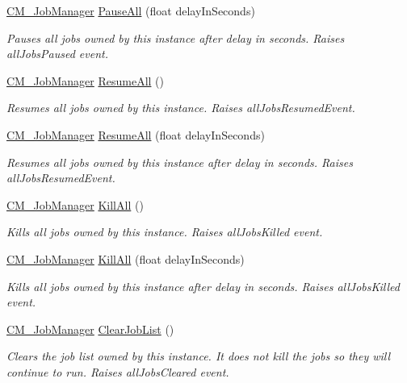 \begin{DoxyCompactItemize}
\hyperlink{class_c_m___job_manager}{C\+M\+\_\+\+Job\+Manager} \hyperlink{class_c_m___job_manager_a32a5f874cae07a572b5f5115c48fc528}{Pause\+All} (float delay\+In\+Seconds)
\begin{DoxyCompactList}\small\item\em Pauses all jobs owned by this instance after delay in seconds. Raises all\+Jobs\+Paused event. \end{DoxyCompactList}\item 
\hyperlink{class_c_m___job_manager}{C\+M\+\_\+\+Job\+Manager} \hyperlink{class_c_m___job_manager_a838152b138f04a0c4c254f3b56bd31fe}{Resume\+All} ()
\begin{DoxyCompactList}\small\item\em Resumes all jobs owned by this instance. Raises all\+Jobs\+Resumed\+Event. \end{DoxyCompactList}\item 
\hyperlink{class_c_m___job_manager}{C\+M\+\_\+\+Job\+Manager} \hyperlink{class_c_m___job_manager_ac87588d5764ca7a71208ff96f3fd67f7}{Resume\+All} (float delay\+In\+Seconds)
\begin{DoxyCompactList}\small\item\em Resumes all jobs owned by this instance after delay in seconds. Raises all\+Jobs\+Resumed\+Event. \end{DoxyCompactList}\item 
\hyperlink{class_c_m___job_manager}{C\+M\+\_\+\+Job\+Manager} \hyperlink{class_c_m___job_manager_ab5a27b84b4fd3893e1dc271570930e62}{Kill\+All} ()
\begin{DoxyCompactList}\small\item\em Kills all jobs owned by this instance. Raises all\+Jobs\+Killed event. \end{DoxyCompactList}\item 
\hyperlink{class_c_m___job_manager}{C\+M\+\_\+\+Job\+Manager} \hyperlink{class_c_m___job_manager_a6c81a2ea2ade217311fef98c4571e9e5}{Kill\+All} (float delay\+In\+Seconds)
\begin{DoxyCompactList}\small\item\em Kills all jobs owned by this instance after delay in seconds. Raises all\+Jobs\+Killed event. \end{DoxyCompactList}\item 
\hyperlink{class_c_m___job_manager}{C\+M\+\_\+\+Job\+Manager} \hyperlink{class_c_m___job_manager_a7684d8a980b6dd3004feb35e978e2163}{Clear\+Job\+List} ()
\begin{DoxyCompactList}\small\item\em Clears the job list owned by this instance. It does not kill the jobs so they will continue to run. Raises all\+Jobs\+Cleared event. \end{DoxyCompactList}\item 

\end{DoxyCompactItemize}

